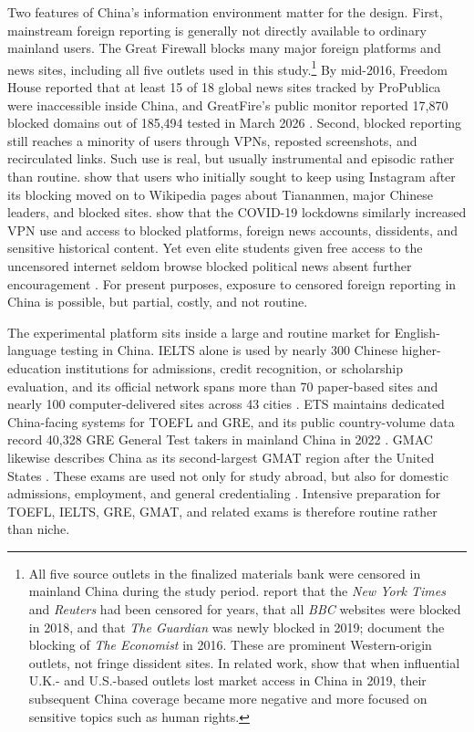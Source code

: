 \documentclass[12pt,american]{article}
\begin{document}
	Two features of China's information environment matter for the design. First, mainstream foreign reporting is generally not directly available to ordinary mainland users. The Great Firewall blocks many major foreign platforms and news sites, including all five outlets used in this study.\footnote{All five source outlets in the finalized materials bank were censored in mainland China during the study period. \citet{FreedomHouse2019} report that the \textit{New York Times} and \textit{Reuters} had been censored for years, that all \textit{BBC} websites were blocked in 2018, and that \textit{The Guardian} was newly blocked in 2019; \citet{FreedomHouse2016} document the blocking of \textit{The Economist} in 2016. These are prominent Western-origin outlets, not fringe dissident sites. In related work, \citet{ChenHan2025EJ} show that when influential U.K.- and U.S.-based outlets lost market access in China in 2019, their subsequent China coverage became more negative and more focused on sensitive topics such as human rights.} By mid-2016, Freedom House reported that at least 15 of 18 global news sites tracked by ProPublica were inaccessible inside China, and GreatFire's public monitor reported 17,870 blocked domains out of 185,494 tested in March 2026 \citep{FreedomHouse2016,FreedomHouseNet2024,GreatFireAnalyzer2026,kingpanroberts2013,roberts2018,stockmann2013}. Second, blocked reporting still reaches a minority of users through VPNs, reposted screenshots, and recirculated links. Such use is real, but usually instrumental and episodic rather than routine. \citet{hobbsroberts2018} show that users who initially sought to keep using Instagram after its blocking moved on to Wikipedia pages about Tiananmen, major Chinese leaders, and blocked sites. \citet{ChangEtAl2022} show that the COVID-19 lockdowns similarly increased VPN use and access to blocked platforms, foreign news accounts, dissidents, and sensitive historical content. Yet even elite students given free access to the uncensored internet seldom browse blocked political news absent further encouragement \citep{chenyang2019}. For present purposes, exposure to censored foreign reporting in China is possible, but partial, costly, and not routine.
	
	The experimental platform sits inside a large and routine market for English-language testing in China. IELTS alone is used by nearly 300 Chinese higher-education institutions for admissions, credit recognition, or scholarship evaluation, and its official network spans more than 70 paper-based sites and nearly 100 computer-delivered sites across 43 cities \citep{BritishCouncilIELTS2026}. ETS maintains dedicated China-facing systems for TOEFL and GRE, and its public country-volume data record 40,328 GRE General Test takers in mainland China in 2022 \citep{ETSTOEFLChina2026,ETSGREInterpretScores2026}. GMAC likewise describes China as its second-largest GMAT region after the United States \citep{GMACChinaMicrosite2021}. These exams are used not only for study abroad, but also for domestic admissions, employment, and general credentialing \citep{BritishCouncilSymposium2024}. Intensive preparation for TOEFL, IELTS, GRE, GMAT, and related exams is therefore routine rather than niche.
	
\end{document}
